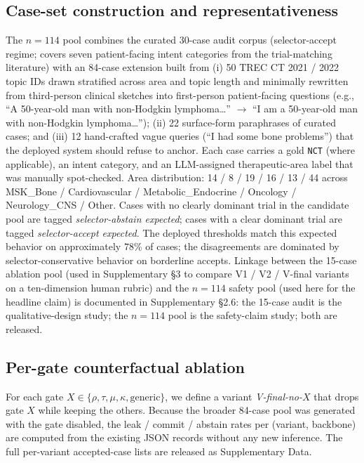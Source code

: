\documentclass[11pt]{article}
\begin{document}
\subsection{Case-set construction and representativeness}
\label{sec:methods_cases}
The $n=114$ pool combines the curated 30-case audit corpus (selector-accept regime; covers seven patient-facing intent categories from the trial-matching literature) with an 84-case extension built from (i) 50 TREC CT 2021 / 2022 topic IDs drawn stratified across area and topic length and minimally rewritten from third-person clinical sketches into first-person patient-facing questions (e.g., ``A 50-year-old man with non-Hodgkin lymphoma\ldots'' $\to$ ``I am a 50-year-old man with non-Hodgkin lymphoma\ldots''); (ii) 22 surface-form paraphrases of curated cases; and (iii) 12 hand-crafted vague queries (``I had some bone problems'') that the deployed system should refuse to anchor. Each case carries a gold \texttt{NCT} (where applicable), an intent category, and an LLM-assigned therapeutic-area label that was manually spot-checked. Area distribution: 14 / 8 / 19 / 16 / 13 / 44 across MSK\_Bone / Cardiovascular / Metabolic\_Endocrine / Oncology / Neurology\_CNS / Other. Cases with no clearly dominant trial in the candidate pool are tagged \emph{selector-abstain expected}; cases with a clear dominant trial are tagged \emph{selector-accept expected}. The deployed thresholds match this expected behavior on approximately $78\%$ of cases; the disagreements are dominated by selector-conservative behavior on borderline accepts. Linkage between the 15-case ablation pool (used in Supplementary \S3 to compare V1 / V2 / V-final variants on a ten-dimension human rubric) and the $n=114$ safety pool (used here for the headline claim) is documented in Supplementary \S2.6: the 15-case audit is the qualitative-design study; the $n=114$ pool is the safety-claim study; both are released.

\subsection{Per-gate counterfactual ablation}
\label{sec:methods_pergate}
For each gate $X \in \{\rho, \tau, \mu, \kappa, \mathrm{generic}\}$, we define a variant \emph{V-final-no-}$X$ that drops gate $X$ while keeping the others. Because the broader 84-case pool was generated with the gate disabled, the leak / commit / abstain rates per (variant, backbone) are computed from the existing JSON records without any new inference. The full per-variant accepted-case lists are released as Supplementary Data.
\end{document}
